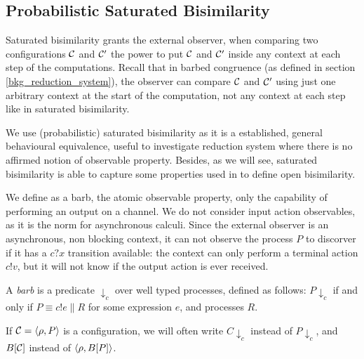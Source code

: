 \subsection{Probabilistic Saturated Bisimilarity}

Saturated bisimilarity \cite{bonchiGeneralTheoryBarbs2014} grants the external observer, when comparing two configurations $\mathcal{C}$ and $\mathcal{C}'$ the power to put $\mathcal{C}$ and $\mathcal{C}'$ inside any context at each step of the computations. Recall that in barbed congruence (as defined in section \ref{bkg_reduction_system}), the observer can compare $\mathcal{C}$ and $\mathcal{C}'$ using just one arbitrary context at the start of the computation, not any context at each step like in saturated bisimilarity.

We use (probabilistic) saturated bisimilarity as it is a established, general behavioural equivalence, useful to investigate reduction system where there is no affirmed notion of observable property. Besides, as we will see, saturated bisimilarity is able to capture some properties used in \cite{dengOpenBisimulationQuantum2012} to define open bisimilarity.


We define as a barb, the atomic observable property, only the capability of performing an output on a channel. We do not consider input action observables, as it is the norm  for asynchronous calculi. Since the external observer is an asynchronous, non blocking context, it can not observe the process $P$ to discorver if it has a $c?x$ transition available: the context can only perform a terminal action $c!v$, but it will not know if the output action is ever received.

\begin{definition}[Barb]
	A \emph{barb} is a predicate $\downarrow_{c}$ over well typed processes, defined as follows: $P \downarrow_{c}$ if and only if $P \equiv c!e \parallel R$ for some expression $e$, and processes $R$.
\end{definition}


If $\mathcal{C} = \langle\rho, P\rangle$ is a configuration, we will often write $C\downarrow_c$ instead of $P\downarrow_c$, and $B[\mathcal{C}]$ instead of $\langle\rho, B[P]\rangle$.

